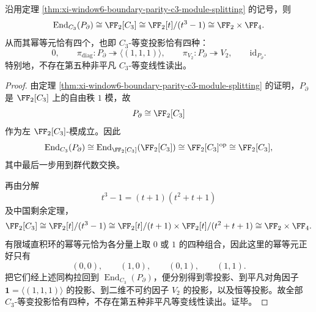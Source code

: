 \begin{theorem}\label{thm:xi-window6-boundary-parity-c3-equivariant-idempotents}
沿用定理 \ref{thm:xi-window6-boundary-parity-c3-module-splitting} 的记号，则
\[
\operatorname{End}_{C_3}(P_{\partial})
\cong
\FF_2[C_3]
\cong
\FF_2[t]/(t^3-1)
\cong
\FF_2\times \FF_4.
\]
从而其幂等元恰有四个，也即 \(C_3\)-等变投影恰有四种：
\[
0,\qquad
\pi_{\mathrm{diag}}:P_{\partial}\twoheadrightarrow \langle(1,1,1)\rangle,\qquad
\pi_{V_2}:P_{\partial}\twoheadrightarrow V_2,\qquad
\mathrm{id}_{P_{\partial}}.
\]
特别地，不存在第五种非平凡 \(C_3\)-等变线性读出。
\end{theorem}
\begin{proof}
由定理 \ref{thm:xi-window6-boundary-parity-c3-module-splitting} 的证明，\(P_{\partial}\) 是 \(\FF_2[C_3]\) 上的自由秩 \(1\) 模，故
\[
P_{\partial}\cong \FF_2[C_3]
\]
作为左 \(\FF_2[C_3]\)-模成立。因此
\[
\operatorname{End}_{C_3}(P_{\partial})
\cong
\operatorname{End}_{\FF_2[C_3]}(\FF_2[C_3])
\cong
\FF_2[C_3]^{\mathrm{op}}
\cong
\FF_2[C_3],
\]
其中最后一步用到群代数交换。

再由分解
\[
t^3-1=(t+1)(t^2+t+1)
\]
及中国剩余定理，
\[
\FF_2[C_3]
\cong
\FF_2[t]/(t^3-1)
\cong
\FF_2[t]/(t+1)\times \FF_2[t]/(t^2+t+1)
\cong
\FF_2\times \FF_4.
\]
有限域直积环的幂等元恰为各分量上取 \(0\) 或 \(1\) 的四种组合，因此这里的幂等元正好只有
\[
(0,0),\qquad (1,0),\qquad (0,1),\qquad (1,1).
\]
把它们经上述同构拉回到 \(\operatorname{End}_{C_3}(P_{\partial})\)，便分别得到零投影、到平凡对角因子 \(\mathbf 1=\langle(1,1,1)\rangle\) 的投影、到二维不可约因子 \(V_2\) 的投影，以及恒等投影。故全部 \(C_3\)-等变投影恰有四种，不存在第五种非平凡等变线性读出。证毕。
\end{proof}
